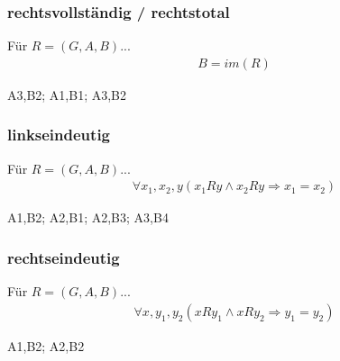 \subsubsection{rechtsvollständig / rechtstotal}
Für  $R = (G,A,B)$...
    \begin{align*}
        B = im(R)
    \end{align*}
\begin{center}
            {
            A3,B2;
            A1,B1;
            A3,B2
            }
        \rechtstotal{}
\end{center}
\subsubsection{linkseindeutig}
Für  $R = (G,A,B)$...
    \begin{align*}
        \forall{x_1,x_2,y}(x_1Ry \wedge x_2Ry \Rightarrow x_1 = x_2)
    \end{align*}
\begin{center}
        {
        A1,B2;
        A2,B1;
        A2,B3;
        A3,B4
        }
    \linkseindeutig{}
\end{center}
\subsubsection{rechtseindeutig}
Für  $R = (G,A,B)$...
    \begin{align*}
        \forall{x,y_1,y_2}(xRy_1 \wedge xRy_2 \Rightarrow y_1 = y_2)
    \end{align*}
 \begin{center}
           {
           A1,B2;
           A2,B2
           }
       \rechtseindeutig{}
 \end{center}
